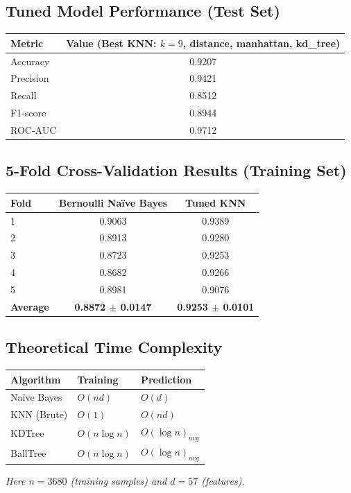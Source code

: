 \documentclass[12pt,a4paper]{article}
\begin{document}
\subsection*{Tuned Model Performance (Test Set)}
\begin{tabular}{lc}
\toprule
Metric & Value (Best KNN: $k=9$, distance, manhattan, kd\_tree)\\
\midrule
Accuracy & 0.9207 \\
Precision & 0.9421 \\
Recall & 0.8512 \\
F1-score & 0.8944 \\
ROC-AUC & 0.9712 \\
\bottomrule
\end{tabular}

\subsection*{5-Fold Cross-Validation Results (Training Set)}
\begin{tabular}{lcc}
\toprule
Fold & Bernoulli Na\"ive Bayes & Tuned KNN \\
\midrule
1 & 0.9063 & 0.9389 \\
2 & 0.8913 & 0.9280 \\
3 & 0.8723 & 0.9253 \\
4 & 0.8682 & 0.9266 \\
5 & 0.8981 & 0.9076 \\
\midrule
\textbf{Average} & \textbf{0.8872 $\pm$ 0.0147} & \textbf{0.9253 $\pm$ 0.0101} \\
\bottomrule
\end{tabular}

\subsection*{Theoretical Time Complexity}
\begin{tabular}{lll}
\toprule
Algorithm & Training & Prediction \\
\midrule
Na\"ive Bayes & $O(nd)$ & $O(d)$ \\
KNN (Brute) & $O(1)$ & $O(nd)$ \\
KDTree & $O(n\log n)$ & $O(\log n)_{avg}$ \\
BallTree & $O(n\log n)$ & $O(\log n)_{avg}$ \\
\bottomrule
\end{tabular}
\vspace{2mm}
\textit{Here $n = 3680$ (training samples) and $d = 57$ (features).}
\end{document}
